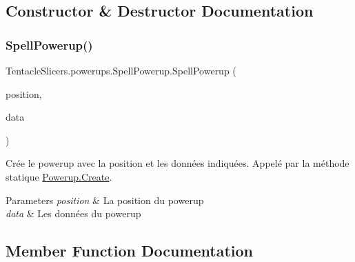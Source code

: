 \subsection{Constructor \& Destructor Documentation}
\mbox{\label{class_tentacle_slicers_1_1powerups_1_1_spell_powerup_a31cbd8d21821ff284ba8b66f13903a5c}} 
\subsubsection{\texorpdfstring{Spell\+Powerup()}{SpellPowerup()}}
{\footnotesize\ttfamily Tentacle\+Slicers.\+powerups.\+Spell\+Powerup.\+Spell\+Powerup (\begin{DoxyParamCaption}\item[{\hyperlink{class_tentacle_slicers_1_1general_1_1_point}{Point}}]{position,  }\item[{\hyperlink{class_tentacle_slicers_1_1powerups_1_1_powerup_data}{Powerup\+Data}}]{data }\end{DoxyParamCaption})}



Crée le powerup avec la position et les données indiquées. Appelé par la méthode statique \hyperlink{class_tentacle_slicers_1_1powerups_1_1_powerup_a9aecde45bf218c2241b7454235e68050}{Powerup.\+Create}. 


\begin{DoxyParams}{Parameters}
{\em position} & La position du powerup \\
\hline
{\em data} & Les données du powerup \\
\hline
\end{DoxyParams}


\subsection{Member Function Documentation}
\mbox{\label{class_tentacle_slicers_1_1powerups_1_1_spell_powerup_a33b18ec95beafbdf151908c1aca562f9}} 
